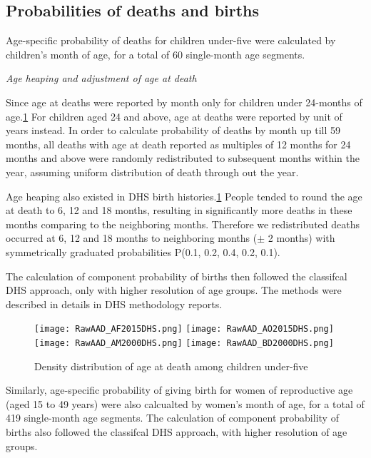 \documentclass[11pt,letterpaper]{article}
\begin{document}
\subsection*{Probabilities of deaths and births}

Age-specific probability of deaths for children under-five were calculated by children's month of age, for a total of 60 single-month age segments. 

\textit{Age heaping and adjustment of age at death}  

Since age at deaths were reported by month only for children under 24-months of age.\ref{fig:asdp1} For children aged 24 and above, age at deaths were reported by unit of years instead. In order to calculate probability of deaths by month up till 59 months, all deaths with age at death reported as multiples of 12 months for 24 months and above were randomly redistributed to subsequent months within the year, assuming uniform distribution of death through out the year.  

Age heaping also existed in DHS birth histories.\ref{fig:asdp1} People tended to round the age at death to 6, 12 and 18 months, resulting in significantly more deaths in these months comparing to the neighboring months. Therefore we redistributed deaths occurred at 6, 12 and 18 months to neighboring months ($\pm$ 2 months) with symmetrically graduated probabilities P(0.1, 0.2, 0.4, 0.2, 0.1).  

The calculation of component probability of births then followed the classifcal DHS approach, only with higher resolution of age groups. The methods were described in details in DHS methodology reports.\cite{croft2018guide}

\begin{figure}[htbp]
\begin{center}
\texttt{[image: RawAAD\_AF2015DHS.png]}
\texttt{[image: RawAAD\_AO2015DHS.png]}
\texttt{[image: RawAAD\_AM2000DHS.png]}
\texttt{[image: RawAAD\_BD2000DHS.png]}
\caption{Density distribution of age at death among children under-five}
\label{fig:asdp1}
\end{center}
\end{figure}

Similarly, age-specific probability of giving birth for women of reproductive age (aged 15 to 49 years) were also calcualted by women's month of age, for a total of 419 single-month age segments. The calculation of component probability of births also followed the classifcal DHS approach, with higher resolution of age groups.\cite{croft2018guide} 
\end{document}
